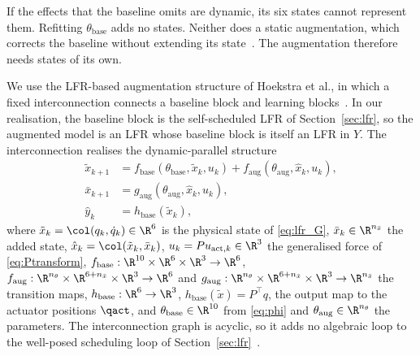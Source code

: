 If the effects that the baseline omits are dynamic, its six states cannot
represent them.
Refitting $\theta_{\mathrm{base}}$ adds no states.
Neither does a static augmentation, which corrects the baseline without
extending its state~\cite[Sec.~2]{hoekstra2025lfr}.
The augmentation therefore needs states of its own.

We use the LFR-based augmentation structure of Hoekstra et al., in which a
fixed interconnection connects a baseline block and learning
blocks~\cite[Sec.~3.2]{hoekstra2025lfr}.
In our realisation, the baseline block is the self-scheduled LFR of
Section~\ref{sec:lfr}, so the augmented model is an LFR whose baseline block
is itself an LFR in $Y$.
The interconnection realises the dynamic-parallel
structure~\cite[Table~1]{hoekstra2026lfr}
\begin{equation}
\begin{aligned}
 \tilde x_{k+1}
 &=f_{\mathrm{base}}(\theta_{\mathrm{base}},\tilde x_k,u_k)
   +f_{\mathrm{aug}}(\theta_{\mathrm{aug}},\hat x_k,u_k),\\
 \bar x_{k+1}
 &=g_{\mathrm{aug}}(\theta_{\mathrm{aug}},\hat x_k,u_k),\\
 \hat y_k&=h_{\mathrm{base}}(\tilde x_k),
\end{aligned}
\label{eq:aug_transition}
\end{equation}
where $\tilde x_k=\col(q_k,\dot q_k)\in\R^6$ is the physical state of
\eqref{eq:lfr_G}, $\bar x_k\in\R^{n_{\bar x}}$ the added state,
$\hat x_k=\col(\tilde x_k,\bar x_k)$, $u_k=Pu_{\mathrm{act},k}\in\R^3$ the
generalised force of \eqref{eq:Ptransform},
$f_{\mathrm{base}}:\R^{10}\times\R^6\times\R^3\to\R^6$,
$f_{\mathrm{aug}}:\R^{n_\theta}\times\R^{6+n_{\bar x}}\times\R^3\to\R^6$ and
$g_{\mathrm{aug}}:\R^{n_\theta}\times\R^{6+n_{\bar x}}\times\R^3\to\R^{n_{\bar x}}$
the transition maps, $h_{\mathrm{base}}:\R^6\to\R^3$,
$h_{\mathrm{base}}(\tilde x)=P^\top q$, the output map to the actuator
positions $\qact$, and $\theta_{\mathrm{base}}\in\R^{10}$ from \eqref{eq:phi}
and $\theta_{\mathrm{aug}}\in\R^{n_\theta}$ the parameters.
The interconnection graph is acyclic, so it adds no algebraic loop to the
well-posed scheduling loop of Section~\ref{sec:lfr}~\cite[Thm.~1]{hoekstra2025lfr}.


